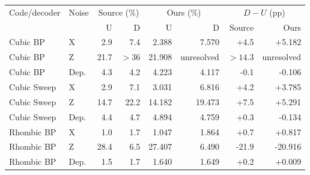 \begin{tabular}{llrrrrrr}
\toprule Code/decoder & Noise & \multicolumn{2}{c}{Source (\%)} & \multicolumn{2}{c}{Ours (\%)} & \multicolumn{2}{c}{$D-U$ (pp)}\\
 & & U & D & U & D & Source & Ours\\\midrule
Cubic BP & X & 2.9 & 7.4 & 2.388 & 7.570 & +4.5 & +5.182\\
Cubic BP & Z & 21.7 & $>36$ & 21.908 & unresolved & $>14.3$ & unresolved\\
Cubic BP & Dep. & 4.3 & 4.2 & 4.223 & 4.117 & -0.1 & -0.106\\
Cubic Sweep & X & 2.9 & 7.1 & 3.031 & 6.816 & +4.2 & +3.785\\
Cubic Sweep & Z & 14.7 & 22.2 & 14.182 & 19.473 & +7.5 & +5.291\\
Cubic Sweep & Dep. & 4.4 & 4.7 & 4.894 & 4.759 & +0.3 & -0.134\\
Rhombic BP & X & 1.0 & 1.7 & 1.047 & 1.864 & +0.7 & +0.817\\
Rhombic BP & Z & 28.4 & 6.5 & 27.407 & 6.490 & -21.9 & -20.916\\
Rhombic BP & Dep. & 1.5 & 1.7 & 1.640 & 1.649 & +0.2 & +0.009\\
\bottomrule\end{tabular}
